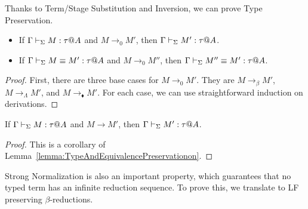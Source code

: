 
Thanks to Term/Stage Substitution and Inversion, we can prove Type
Preservation.

\begin{lemma}
    \label{lemma:TypeAndEquivalencePreservationon}
    \begin{itemize}
    \item If \( \Gamma \vdash_\Sigma M : \tau @ A \) and \( M \longrightarrow_0 M' \), then \( \Gamma \vdash_\Sigma M' : \tau @ A \).
    \item If \( \Gamma \vdash_\Sigma M \equiv M' : \tau @ A \) and \( M \longrightarrow_0 M'' \), then \( \Gamma \vdash_\Sigma M'' \equiv M' : \tau @ A \).
    \end{itemize}
\end{lemma}

\begin{proof}
    First, there are three base cases for $M \longrightarrow_0 M'$.  They are $M
    \longrightarrow_\beta M'$, $M \longrightarrow_\Lambda M'$, and $M
    \longrightarrow_\blacklozenge M'$.  For each case, we can use
    straightforward induction on derivations.
\end{proof}

\begin{theorem}
    \label{theorem:TypePreservation}
    If \( \Gamma \vdash_\Sigma M : \tau @ A \) and \( M \longrightarrow M' \), then \( \Gamma \vdash_\Sigma M' : \tau @ A \).
\end{theorem}

\begin{proof} 
    This is a corollary of Lemma~\ref{lemma:TypeAndEquivalencePreservationon}.
\end{proof}


Strong Normalization is also an important property, which guarantees that no
typed term has an infinite reduction sequence. To prove this, we translate \LMD
to LF~\cite{harper1993framework} preserving \( \beta \)-reductions.

